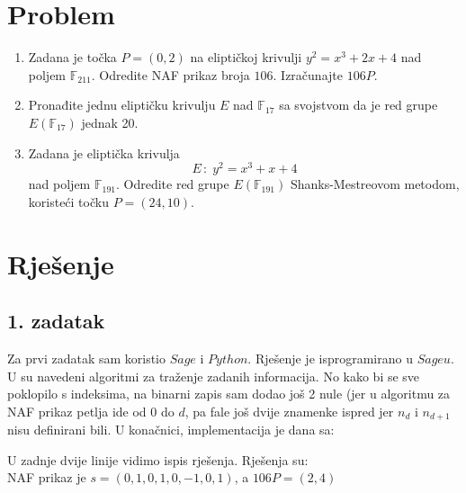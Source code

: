 \documentclass[12pt, a4paper]{article}
\begin{document}
\begin{spacing}{1.5}
\section{Problem}
\begin{enumerate}
\item Zadana je točka $P=(0,2)$ na eliptičkoj krivulji $y^2=x^3+2x+4$ nad poljem $\mathbb{F}_{211}$. Odredite NAF prikaz broja $106$. Izračunajte $106P$.
\item Pronađite jednu eliptičku krivulju $E$ nad $\mathbb{F}_{17}$ sa svojstvom da je red grupe $E(\mathbb{F}_{17})$ jednak 20.
\item Zadana je eliptička krivulja
\[E \, : \; y^2=x^3+x+4  \]
nad poljem $\mathbb{F}_{191}$. Odredite red grupe $E(\mathbb{F}_{191})$ Shanks-Mestreovom metodom, koristeći točku $P=(24,10)$.
\end{enumerate}
\newpage
\section{Rješenje}
\subsection{1. zadatak}
Za prvi zadatak sam koristio $Sage$ i $Python$. Rješenje je isprogramirano u $Sageu$. U \cite[s. ~58-59]{ekk} su navedeni algoritmi za traženje zadanih informacija. No kako bi se sve poklopilo s indeksima, na binarni zapis sam dodao još 2 nule (jer u algoritmu za NAF prikaz petlja ide od $0$ do $d$, pa fale još dvije znamenke ispred jer $n_d$ i $n_{d+1}$ nisu definirani bili. U konačnici, implementacija je dana sa:

U zadnje dvije linije vidimo ispis rješenja. Rješenja su:\\
NAF prikaz je $s=(0,1,0,1,0,-1,0,1)$, a $106P=(2,4)$
\newpage

\end{spacing}
\end{document}
